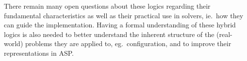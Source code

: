 There remain many open questions about these logics regarding their fundamental characteristics
as well as their practical use in solvers, ie.\ how they can guide the implementation.
%
Having a formal understanding of these hybrid logics is also needed
to better understand the inherent structure of the (real-world) problems they are applied to, eg.\ configuration, and to improve their representations in ASP.


%
